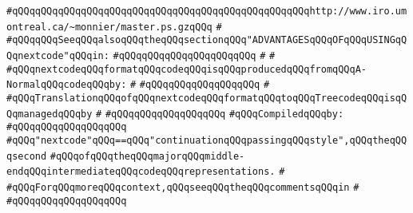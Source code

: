 \verb|#qQQqqQQqqQQqqQQqqQQqqQQqqQQqqQQqqQQqqQQqqQQqqQQqqQQqhttp://www.iro.umontreal.ca/~monnier/master.ps.gzqQQq|\newline
\verb|#|\newline
\verb|#qQQqqQQqSeeqQQqalsoqQQqtheqQQqsectionqQQq"ADVANTAGESqQQqOFqQQqUSINGqQQqnextcode"qQQqin:|\newline
\verb|#qQQqqQQqqQQqqQQqqQQqqQQq|\newline
\verb|#|\newline
\verb|#|\newline
\verb|#qQQqnextcodeqQQqformatqQQqcodeqQQqisqQQqproducedqQQqfromqQQqA-NormalqQQqcodeqQQqby:|\newline
\verb|#|\newline
\verb|#qQQqqQQqqQQqqQQqqQQq|\newline
\verb|#|\newline
\verb|#qQQqTranslationqQQqofqQQqnextcodeqQQqformatqQQqtoqQQqTreecodeqQQqisqQQqmanagedqQQqby|\newline
\verb|#|\newline
\verb|#qQQqqQQqqQQqqQQqqQQq|\newline
\newline
\verb|#qQQqCompiledqQQqby:|\newline
\verb|#qQQqqQQqqQQqqQQqqQQq|\newline
\newline
\newline
\newline
\verb|#qQQq"nextcode"qQQq==qQQq"continuationqQQqpassingqQQqstyle",qQQqtheqQQqsecond|\newline
\verb|#qQQqofqQQqtheqQQqmajorqQQqmiddle-endqQQqintermediateqQQqcodeqQQqrepresentations.|\newline
\verb|#|\newline
\verb|#qQQqForqQQqmoreqQQqcontext,qQQqseeqQQqtheqQQqcommentsqQQqin|\newline
\verb|#|\newline
\verb|#qQQqqQQqqQQqqQQqqQQq|\newline
